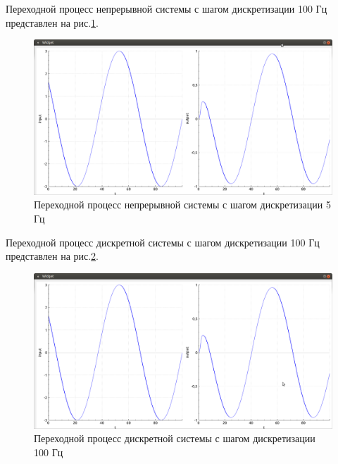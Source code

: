 \documentclass[14pt,a4paper]{extreport}
\begin{document}
Переходной процесс непрерывной системы с шагом дискретизации 
100 Гц представлен на рис.\ref{fig:con_100hz}.
\begin{figure}[H]
    \centering
    \includegraphics[width=160mm]{img/con_100hz.png}
    \caption{Переходной процесс непрерывной системы с шагом дискретизации 5 Гц}
    \label{fig:con_100hz}
\end{figure}

Переходной процесс дискретной системы с шагом дискретизации 
100 Гц представлен на рис.\ref{fig:dis_100hz}.

\begin{figure}[H]
    \centering
    \includegraphics[width=160mm]{img/dis_100hz.png}
    \caption{Переходной процесс дискретной системы 
    с шагом дискретизации 100 Гц}
    \label{fig:dis_100hz}
\end{figure}
\end{document}
